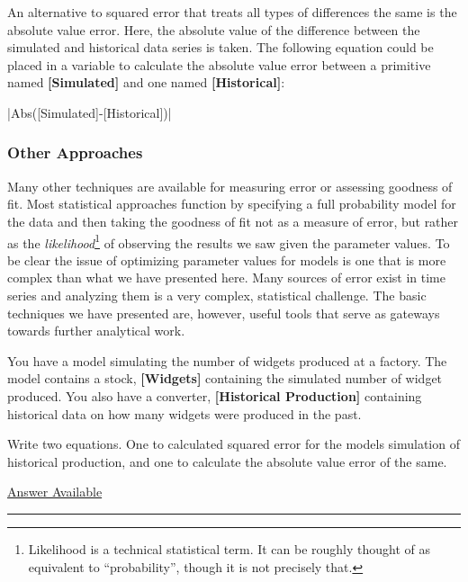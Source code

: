 \documentclass[]{memoir}
\newcommand{\FunctionTok}[1]{\textcolor[rgb]{0.02,0.16,0.49}{{#1}}}
\newcommand{\NormalTok}[1]{{#1}}
\newcommand{\p}[1]{\textbf{{[}#1{]}}}
\begin{document}
An alternative to squared error that treats all types of differences the
same is the absolute value error. Here, the absolute value of the
difference between the simulated and historical data series is taken.
The following equation could be placed in a variable to calculate the
absolute value error between a primitive named \p{Simulated} and one
named \p{Historical}:

|\FunctionTok{Abs}\NormalTok{([Simulated]-[Historical])}|

\subsubsection{Other Approaches}

Many other techniques are available for measuring error or assessing
goodness of fit. Most statistical approaches function by specifying a
full probability model for the data and then taking the goodness of fit
not as a measure of error, but rather as the \emph{likelihood}\footnote{Likelihood
  is a technical statistical term. It can be roughly thought of as
  equivalent to ``probability'', though it is not precisely that.} of
observing the results we saw given the parameter values. To be clear the
issue of optimizing parameter values for models is one that is more
complex than what we have presented here. Many sources of error exist in
time series and analyzing them is a very complex, statistical challenge.
The basic techniques we have presented are, however, useful tools that
serve as gateways towards further analytical work.


You have a model simulating the number of widgets produced at a factory.
The model contains a stock, \p{Widgets} containing the simulated number
of widget produced. You also have a converter, \p{Historical Production}
containing historical data on how many widgets were produced in the
past.

Write two equations. One to calculated squared error for the models
simulation of historical production, and one to calculate the absolute
value error of the same.

\hyperref[Ans-14-1]{Answer Available}

\begin{center}\rule{3in}{0.4pt}\end{center}
\end{document}
